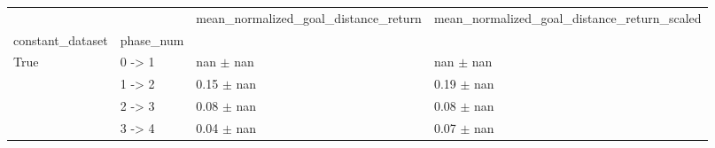 \begin{tabular}{llll}
\toprule
 &  & mean_normalized_goal_distance_return & mean_normalized_goal_distance_return_scaled \\
constant_dataset & phase_num &  &  \\
\midrule
\multirow[t]{4}{*}{True} & 0 -> 1 & nan $\pm$ nan & nan $\pm$ nan \\
 & 1 -> 2 & 0.15 $\pm$ nan & 0.19 $\pm$ nan \\
 & 2 -> 3 & 0.08 $\pm$ nan & 0.08 $\pm$ nan \\
 & 3 -> 4 & 0.04 $\pm$ nan & 0.07 $\pm$ nan \\
\cline{1-4}
\bottomrule
\end{tabular}

